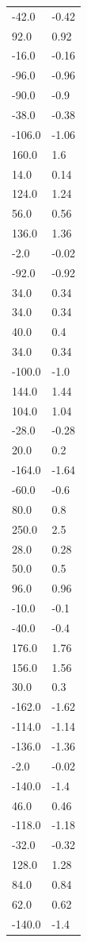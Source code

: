 \begin{longtable}{ll}
-42.0 & -0.42 \\
92.0 & 0.92 \\
-16.0 & -0.16 \\
-96.0 & -0.96 \\
-90.0 & -0.9 \\
-38.0 & -0.38 \\
-106.0 & -1.06 \\
160.0 & 1.6 \\
14.0 & 0.14 \\
124.0 & 1.24 \\
56.0 & 0.56 \\
136.0 & 1.36 \\
-2.0 & -0.02 \\
-92.0 & -0.92 \\
34.0 & 0.34 \\
34.0 & 0.34 \\
40.0 & 0.4 \\
34.0 & 0.34 \\
-100.0 & -1.0 \\
144.0 & 1.44 \\
104.0 & 1.04 \\
-28.0 & -0.28 \\
20.0 & 0.2 \\
-164.0 & -1.64 \\
-60.0 & -0.6 \\
80.0 & 0.8 \\
250.0 & 2.5 \\
28.0 & 0.28 \\
50.0 & 0.5 \\
96.0 & 0.96 \\
-10.0 & -0.1 \\
-40.0 & -0.4 \\
176.0 & 1.76 \\
156.0 & 1.56 \\
30.0 & 0.3 \\
-162.0 & -1.62 \\
-114.0 & -1.14 \\
-136.0 & -1.36 \\
-2.0 & -0.02 \\
-140.0 & -1.4 \\
46.0 & 0.46 \\
-118.0 & -1.18 \\
-32.0 & -0.32 \\
128.0 & 1.28 \\
84.0 & 0.84 \\
62.0 & 0.62 \\
-140.0 & -1.4 \\

\end{longtable}
